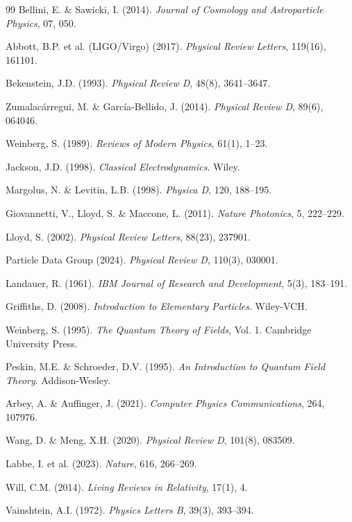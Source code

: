 \documentclass[12pt,a4paper]{book}
\theoremstyle{definition}
\theoremstyle{remark}
\begin{document}
\begin{thebibliography}{99}
 Bellini, E. \& Sawicki, I. (2014). \textit{Journal of Cosmology and Astroparticle Physics}, 07, 050.

 Abbott, B.P. et al. (LIGO/Virgo) (2017). \textit{Physical Review Letters}, 119(16), 161101.

 Bekenstein, J.D. (1993). \textit{Physical Review D}, 48(8), 3641--3647.

 Zumalac\'arregui, M. \& Garc\'ia-Bellido, J. (2014). \textit{Physical Review D}, 89(6), 064046.

 Weinberg, S. (1989). \textit{Reviews of Modern Physics}, 61(1), 1--23.

 Jackson, J.D. (1998). \textit{Classical Electrodynamics}. Wiley.

 Margolus, N. \& Levitin, L.B. (1998). \textit{Physica D}, 120, 188--195.

 Giovannetti, V., Lloyd, S. \& Maccone, L. (2011). \textit{Nature Photonics}, 5, 222--229.

 Lloyd, S. (2002). \textit{Physical Review Letters}, 88(23), 237901.

 Particle Data Group (2024). \textit{Physical Review D}, 110(3), 030001.

 Landauer, R. (1961). \textit{IBM Journal of Research and Development}, 5(3), 183--191.

 Griffiths, D. (2008). \textit{Introduction to Elementary Particles}. Wiley-VCH.

 Weinberg, S. (1995). \textit{The Quantum Theory of Fields}, Vol. 1. Cambridge University Press.

 Peskin, M.E. \& Schroeder, D.V. (1995). \textit{An Introduction to Quantum Field Theory}. Addison-Wesley.

 Arbey, A. \& Auffinger, J. (2021). \textit{Computer Physics Communications}, 264, 107976.

 Wang, D. \& Meng, X.H. (2020). \textit{Physical Review D}, 101(8), 083509.

 Labbe, I. et al. (2023). \textit{Nature}, 616, 266--269.

 Will, C.M. (2014). \textit{Living Reviews in Relativity}, 17(1), 4.

 Vainshtein, A.I. (1972). \textit{Physics Letters B}, 39(3), 393--394.


\end{thebibliography}
\end{document}

